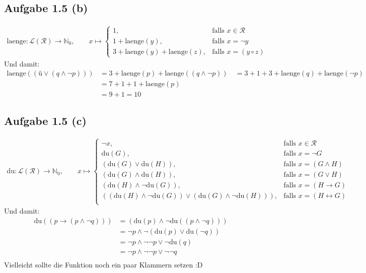 \documentclass[12pt,a4paper]{article} %
\newcommand{\N}{\mathbb{N}}
\newcommand{\falls}{\text{falls }}
\begin{document}
\subsection*{Aufgabe 1.5 (b)}
\begin{align*}
\text{laenge}:\mathcal{L}(\mathcal{R})\to\N_0,\qquad x\mapsto \left\lbrace\begin{array}{cl}
1, & \falls x\in\mathcal{R}\\
1+\text{laenge}(y), & \falls x=\neg y\\
3+\text{laenge}(y)+\text{laenge}(z), & \falls x=(y\circ z)
\end{array}\right.
\end{align*}
Und damit:
\begin{align*}
\text{laenge}((ü\vee(q\wedge\neg p))) 
&=3+\text{laenge}(p)+\text{laenge}((q\wedge\neg p))\
&=3+1+3+\text{laenge}(q)+\text{laenge}(\neg p)\\
&=7 + 1 + 1+ \text{laenge}(p)\\
&=9+1=10
\end{align*}

\subsection*{Aufgabe 1.5 (c)}
\begin{align*}
\text{du}:\mathcal{L}(\mathcal{R})\to\N_0,\qquad x\mapsto \left\lbrace\begin{array}{cl}
\neg x, & \falls x\in\mathcal{R}\\
\text{du}(G), & \falls x=\neg G\\
(\text{du}(G)\vee\text{du}(H)), & \falls x=(G\wedge H)\\
(\text{du}(G)\wedge\text{du}(H)), & \falls x=(G\vee H)\\
(\text{du}(H)\wedge\neg\text{du}(G)), & \falls x=(H\to G)\\
((\text{du}(H)\wedge\neg \text{du}(G))\vee(\text{du}(G)\wedge\neg\text{du}(H))), & \falls x=(H\leftrightarrow G)\\
\end{array}\right.
\end{align*}
Und damit:
\begin{align*}
\text{du}((p\to(p\wedge\neg q)))
&=(\text{du}(p)\wedge\neg\text{du}((p\wedge\neg q)))\\
&=\neg p\wedge\neg(\text{du}(p)\vee\text{du}(\neg q))\\
&=\neg p\wedge\neg\neg p\vee\neg\text{du}(q)\\
&=\neg p\wedge\neg\neg p\vee\neg\neg q\\
\end{align*}
Vielleicht sollte die Funktion noch ein paar Klammern setzen :D
\end{document}
